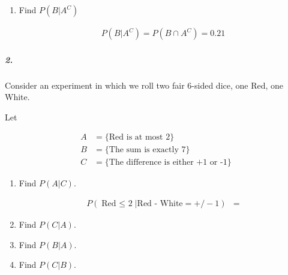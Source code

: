 \begin{enumerate}[label=(\alph*)]
        \item Find $P(B|A^C)$
            
            \begin{mdframed}
                \begin{equation*}
                    \begin{gathered}
                        P(B|A^C) = P(B \cap A^C) = \boxed{0.21}
                    \end{gathered}
                \end{equation*}    
            \end{mdframed}
    \end{enumerate}

    \pagebreak

    \subparagraph*{2.}
    Consider an experiment in which we roll two fair 6-sided dice, one Red, one White.
    
    Let

    \begin{align*}
        A & = \{\text{Red is at most 2}\}                   \\
        B & = \{\text{The sum is exactly 7}\}               \\
        C & = \{\text{The difference is either +1 or -1}\}
    \end{align*}


    \begin{enumerate}[label=(\alph*)]
        \item Find $P(A|C)$.
        
        \begin{mdframed}
            \begin{align*}
                P(\text{Red $\leq$ 2}|\text{Red - White} = +/-1) & = 
            \end{align*}
        \end{mdframed}

        \item Find $P(C|A)$.
        \item Find $P(B|A)$.
        \item Find $P(C|B)$.
    \end{enumerate}


